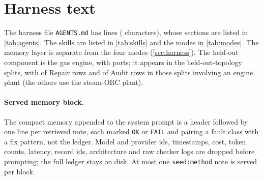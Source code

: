 \section{Harness text}\label{app:harness}

The harness file \texttt{AGENTS.md} has  lines ( characters), whose sections are listed in \cref{tab:agents}. The skills are listed in \cref{tab:skills} and the modes in \cref{tab:modes}. The memory layer is separate from the four modes (\cref{sec:harness}). The held-out component is the gas engine, with  ports; it appears in the held-out-topology splits, with  of  Repair rows and  of  Audit rows in those splits involving an engine plant (the others use the steam-ORC plant).

\paragraph{Served memory block.}
The compact memory appended to the system prompt is a header followed by one line per retrieved note, each marked \texttt{OK} or \texttt{FAIL} and pairing a fault class with a fix pattern, not the ledger. Model and provider ids, timestamps, cost, token counts, latency, record ids, architecture and raw checker logs are dropped before prompting; the full ledger stays on disk. At most one \texttt{seed:method} note is served per block.

\begin{table}[tbp]
\centering

\caption{Sections of \texttt{AGENTS.md} with the number of lines excerpted into the harness data and the first line of each (truncated). Data: \texttt{assets/harness.json}.}
\label{tab:agents}
\end{table}

\begin{table}[tbp]
\centering

\caption{The  skills and the components each covers; port and parameter sections of component skills are generated from the registry.}
\label{tab:skills}
\end{table}

\begin{table}[tbp]
\centering

\caption{Harness modes. In skill modes the bodies of the selected skills are appended to the system message.}
\label{tab:modes}
\end{table}

